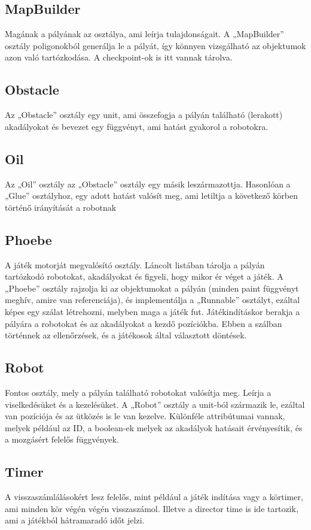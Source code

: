 \subsection{MapBuilder}
Magának a pályának az osztálya, ami leírja tulajdonságait. A „MapBuilder” osztály poligonokból generálja le a pályát, így könnyen vizsgálható az objektumok azon való tartózkodása. A checkpoint-ok is itt vannak tárolva.
\subsection{Obstacle}
Az „Obstacle” osztály egy unit, ami összefogja a pályán található (lerakott) akadályokat és bevezet egy függvényt, ami hatást gyakorol a robotokra.
\subsection{Oil}
Az „Oil” osztály az „Obstacle” osztály egy másik leszármazottja. Hasonlóan a „Glue” osztályhoz, egy adott hatást valósít meg, ami letiltja a következő körben történő irányítását a robotnak
\subsection{Phoebe}
A játék motorját megvalósító osztály. Láncolt listában tárolja a pályán tartózkodó robotokat, akadályokat és figyeli, hogy mikor ér véget a játék. A „Phoebe” osztály rajzolja ki az objektumokat a pályán (minden paint függvényt meghív, amire van referenciája), és implementálja a „Runnable” osztályt, ezáltal képes egy szálat létrehozni, melyben maga a játék fut. Játékindításkor berakja a pályára a robotokat és az akadályokat a kezdő pozíciókba. Ebben a szálban történnek az ellenőrzések, és a játékosok által választott döntések.

\subsection{Robot}
Fontos osztály, mely a pályán található robotokat valósítja meg. Leírja a viselkedésüket és a kezelésüket. A „Robot” osztály a unit-ból származik le, ezáltal van pozíciója és az ütközés is le van kezelve. Különféle attribútumai vannak, melyek például az ID, a boolean-ek melyek az akadályok hatásait érvényesítik, és a mozgásért felelős függvények.

\subsection{Timer}
A visszaszámlálásokért lesz felelős, mint például a játék indítása vagy a körtimer, ami minden kör végén végén visszaszámol. Illetve a director time is ide tartozik, ami a játékból hátramaradó időt jelzi.
